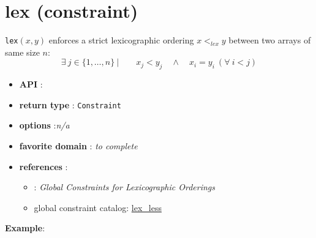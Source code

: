 \label{lex}
\hypertarget{lex}{}

\section{lex (constraint)}\label{lex:lexconstraint}\hypertarget{lex:lexconstraint}{}
\begin{notedef}
  \texttt{lex}$(x,y)$ enforces a strict lexicographic ordering  $x <_{lex} y$ between two arrays of same size $n$:
$$\exists\ j\in\{1,\ldots,n\}\ |\qquad x_j<y_j\quad \land\quad x_i=y_i\ (\forall\  i<j)$$
\end{notedef}

\begin{itemize}
	\item \textbf{API} : 
	\item \textbf{return type} : \texttt{Constraint}
	\item \textbf{options} :\emph{n/a}
	\item \textbf{favorite domain} : \emph{to complete}
	\item \textbf{references} :
      \begin{itemize}
      \item \cite{FrischCP02}: \emph{Global Constraints for Lexicographic Orderings}
      \item global constraint catalog: \href{http://www.emn.fr/x-info/sdemasse/gccat/Clex_less.html}{lex\_less}
      \end{itemize}
\end{itemize}

\textbf{Example}:

